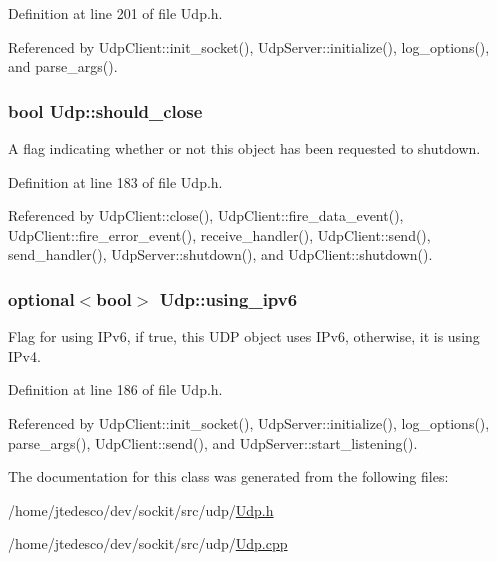 Definition at line 201 of file Udp.h.



Referenced by UdpClient::init\_\-socket(), UdpServer::initialize(), log\_\-options(), and parse\_\-args().

\hypertarget{classUdp_a01a27e2a1b252f39cefd61eb81a18220}{
\subsubsection[{should\_\-close}]{\setlength{\rightskip}{0pt plus 5cm}bool {\bf Udp::should\_\-close}}}
\label{classUdp_a01a27e2a1b252f39cefd61eb81a18220}
A flag indicating whether or not this object has been requested to shutdown. 

Definition at line 183 of file Udp.h.



Referenced by UdpClient::close(), UdpClient::fire\_\-data\_\-event(), UdpClient::fire\_\-error\_\-event(), receive\_\-handler(), UdpClient::send(), send\_\-handler(), UdpServer::shutdown(), and UdpClient::shutdown().

\hypertarget{classUdp_a3522427333a9a3520e8c8a207cb1a6f2}{
\subsubsection[{using\_\-ipv6}]{\setlength{\rightskip}{0pt plus 5cm}optional$<$bool$>$ {\bf Udp::using\_\-ipv6}}}
\label{classUdp_a3522427333a9a3520e8c8a207cb1a6f2}
Flag for using IPv6, if true, this UDP object uses IPv6, otherwise, it is using IPv4. 

Definition at line 186 of file Udp.h.



Referenced by UdpClient::init\_\-socket(), UdpServer::initialize(), log\_\-options(), parse\_\-args(), UdpClient::send(), and UdpServer::start\_\-listening().



The documentation for this class was generated from the following files:\begin{DoxyCompactItemize}
\item 
/home/jtedesco/dev/sockit/src/udp/\hyperlink{Udp_8h}{Udp.h}\item 
/home/jtedesco/dev/sockit/src/udp/\hyperlink{Udp_8cpp}{Udp.cpp}\end{DoxyCompactItemize}

